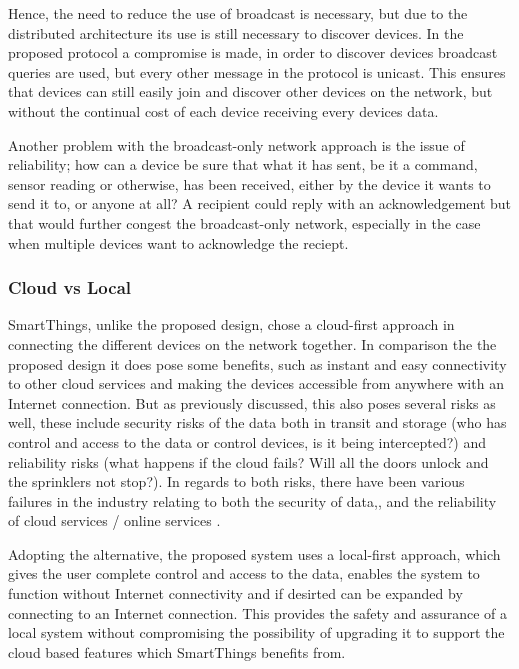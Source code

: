 Hence, the need to reduce the use of broadcast is necessary, but due to the distributed architecture its use is still necessary to discover devices. In the proposed protocol a compromise is made, in order to discover devices broadcast queries are used, but every other message in the protocol is unicast. This ensures that devices can still easily join and discover other devices on the network, but without the continual cost of each device receiving every devices data.

Another problem with the broadcast-only network approach is the issue of reliability; how can a device be sure that what it has sent, be it a command, sensor reading or otherwise, has been received, either by the device it wants to send it to, or anyone at all? A recipient could reply with an acknowledgement but that would further congest the broadcast-only network, especially in the case when multiple devices want to acknowledge the reciept.


\subsubsection{Cloud vs Local} %
\label{ssub:cloud_vs_local}
SmartThings, unlike the proposed design, chose a cloud-first approach in connecting the different devices on the network together. In comparison the the proposed design it does pose some benefits, such as instant and easy connectivity to other cloud services and making the devices accessible from anywhere with an Internet connection. But as previously discussed, this also poses several risks as well, these include security risks of the data both in transit and storage (who has control and access to the data or control devices, is it being intercepted?) and reliability risks (what happens if the cloud fails? Will all the doors unlock and the sprinklers not stop?). In regards to both risks, there have been various failures in the industry relating to both the security of data,\cite{Playstation}, and the reliability of cloud services / online services \cite{Amazon, Google}. 

Adopting the alternative, the proposed system uses a local-first approach, which gives the user complete control and access to the data, enables the system to function without Internet connectivity and if desirted can be expanded by connecting to an Internet connection. This provides the safety and assurance of a local system without compromising the possibility of upgrading it to support the cloud based features which SmartThings benefits from.

